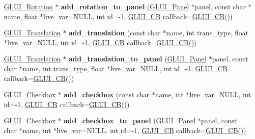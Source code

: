 \begin{DoxyCompactItemize}
\item 
\hypertarget{class_g_l_u_i_a384601abb0c898da96434cb068b7335f}{\hyperlink{class_g_l_u_i___rotation}{G\+L\+U\+I\+\_\+\+Rotation} $\ast$ {\bfseries add\+\_\+rotation\+\_\+to\+\_\+panel} (\hyperlink{class_g_l_u_i___panel}{G\+L\+U\+I\+\_\+\+Panel} $\ast$panel, const char $\ast$name, float $\ast$live\+\_\+var=N\+U\+L\+L, int id=-\/1, \hyperlink{class_g_l_u_i___c_b}{G\+L\+U\+I\+\_\+\+C\+B} callback=\hyperlink{class_g_l_u_i___c_b}{G\+L\+U\+I\+\_\+\+C\+B}())}\label{class_g_l_u_i_a384601abb0c898da96434cb068b7335f}

\item 
\hypertarget{class_g_l_u_i_a65a89c82b1ac612af6c4b96d00e91052}{\hyperlink{class_g_l_u_i___translation}{G\+L\+U\+I\+\_\+\+Translation} $\ast$ {\bfseries add\+\_\+translation} (const char $\ast$name, int trans\+\_\+type, float $\ast$live\+\_\+var=N\+U\+L\+L, int id=-\/1, \hyperlink{class_g_l_u_i___c_b}{G\+L\+U\+I\+\_\+\+C\+B} callback=\hyperlink{class_g_l_u_i___c_b}{G\+L\+U\+I\+\_\+\+C\+B}())}\label{class_g_l_u_i_a65a89c82b1ac612af6c4b96d00e91052}

\item 
\hypertarget{class_g_l_u_i_af1b40b8b22311afaba99862940006c2a}{\hyperlink{class_g_l_u_i___translation}{G\+L\+U\+I\+\_\+\+Translation} $\ast$ {\bfseries add\+\_\+translation\+\_\+to\+\_\+panel} (\hyperlink{class_g_l_u_i___panel}{G\+L\+U\+I\+\_\+\+Panel} $\ast$panel, const char $\ast$name, int trans\+\_\+type, float $\ast$live\+\_\+var=N\+U\+L\+L, int id=-\/1, \hyperlink{class_g_l_u_i___c_b}{G\+L\+U\+I\+\_\+\+C\+B} callback=\hyperlink{class_g_l_u_i___c_b}{G\+L\+U\+I\+\_\+\+C\+B}())}\label{class_g_l_u_i_af1b40b8b22311afaba99862940006c2a}

\item 
\hypertarget{class_g_l_u_i_abe2e9677a544d37485e1913a143d7ef7}{\hyperlink{class_g_l_u_i___checkbox}{G\+L\+U\+I\+\_\+\+Checkbox} $\ast$ {\bfseries add\+\_\+checkbox} (const char $\ast$name, int $\ast$live\+\_\+var=N\+U\+L\+L, int id=-\/1, \hyperlink{class_g_l_u_i___c_b}{G\+L\+U\+I\+\_\+\+C\+B} callback=\hyperlink{class_g_l_u_i___c_b}{G\+L\+U\+I\+\_\+\+C\+B}())}\label{class_g_l_u_i_abe2e9677a544d37485e1913a143d7ef7}

\item 
\hypertarget{class_g_l_u_i_aec624d071e0f7eedce5946a68d331949}{\hyperlink{class_g_l_u_i___checkbox}{G\+L\+U\+I\+\_\+\+Checkbox} $\ast$ {\bfseries add\+\_\+checkbox\+\_\+to\+\_\+panel} (\hyperlink{class_g_l_u_i___panel}{G\+L\+U\+I\+\_\+\+Panel} $\ast$panel, const char $\ast$name, int $\ast$live\+\_\+var=N\+U\+L\+L, int id=-\/1, \hyperlink{class_g_l_u_i___c_b}{G\+L\+U\+I\+\_\+\+C\+B} callback=\hyperlink{class_g_l_u_i___c_b}{G\+L\+U\+I\+\_\+\+C\+B}())}\label{class_g_l_u_i_aec624d071e0f7eedce5946a68d331949}


\end{DoxyCompactItemize}
